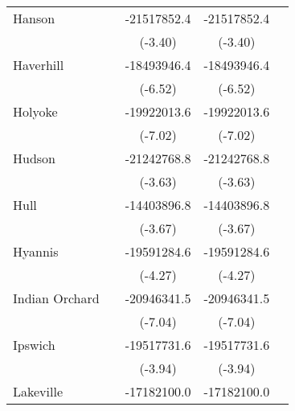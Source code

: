 {\begin{tabular}{l*{4}{c}}
\addlinespace
Hanson              &                     & -21517852.4\sym{***}& -21517852.4\sym{***}&                     \\
                    &                     &     (-3.40)         &     (-3.40)         &                     \\
\addlinespace
Haverhill           &                     & -18493946.4\sym{***}& -18493946.4\sym{***}&                     \\
                    &                     &     (-6.52)         &     (-6.52)         &                     \\
\addlinespace
Holyoke             &                     & -19922013.6\sym{***}& -19922013.6\sym{***}&                     \\
                    &                     &     (-7.02)         &     (-7.02)         &                     \\
\addlinespace
Hudson              &                     & -21242768.8\sym{***}& -21242768.8\sym{***}&                     \\
                    &                     &     (-3.63)         &     (-3.63)         &                     \\
\addlinespace
Hull                &                     & -14403896.8\sym{***}& -14403896.8\sym{***}&                     \\
                    &                     &     (-3.67)         &     (-3.67)         &                     \\
\addlinespace
Hyannis             &                     & -19591284.6\sym{***}& -19591284.6\sym{***}&                     \\
                    &                     &     (-4.27)         &     (-4.27)         &                     \\
\addlinespace
Indian Orchard      &                     & -20946341.5\sym{***}& -20946341.5\sym{***}&                     \\
                    &                     &     (-7.04)         &     (-7.04)         &                     \\
\addlinespace
Ipswich             &                     & -19517731.6\sym{***}& -19517731.6\sym{***}&                     \\
                    &                     &     (-3.94)         &     (-3.94)         &                     \\
\addlinespace
Lakeville           &                     & -17182100.0\sym{***}& -17182100.0\sym{***}&                     \\

\end{tabular}}
